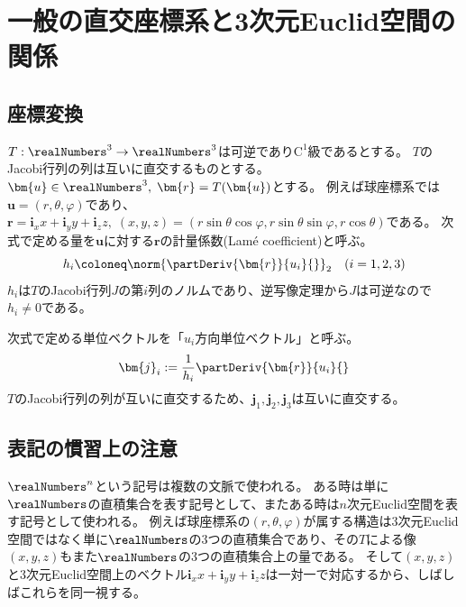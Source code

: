 \chapter{一般の直交座標系と3次元Euclid空間の関係}
    \section{座標変換}
        $T:\realNumbers^3\to\realNumbers^3$は可逆であり$\mathrm{C}^1$級であるとする。
        $T$のJacobi行列の列は互いに直交するものとする。
        $\bm{u}\in\realNumbers^3,\;\bm{r} = T(\bm{u})$とする。
        例えば球座標系では$\bm{u} = (r,\theta,\varphi)$であり、$\bm{r} = \bm{i}_x x + \bm{i}_y y + \bm{i}_z z,\;(x,y,z) = (r\sin\theta\cos\varphi,r\sin\theta\sin\varphi,r\cos\theta)$である。
        次式で定める量を$\bm{u}$に対する$\bm{r}$の計量係数(Lam\'{e} coefficient)と呼ぶ。
        \[ h_i \coloneq \norm{\partDeriv{\bm{r}}{u_i}{}}_2 \quad (i=1,2,3) \]
        $h_i$は$T$のJacobi行列$J$の第$i$列のノルムであり、逆写像定理から$J$は可逆なので$h_i \neq 0$である。
        \par
        次式で定める単位ベクトルを「$u_i$方向単位ベクトル」と呼ぶ。
        \[ \bm{j}_i := \frac{1}{h_i}\partDeriv{\bm{r}}{u_i}{} \]
        $T$のJacobi行列の列が互いに直交するため、$\bm{j}_1,\bm{j}_2,\bm{j}_3$は互いに直交する。
    \section{表記の慣習上の注意}
        $\realNumbers^n$という記号は複数の文脈で使われる。
        ある時は単に$\realNumbers$の直積集合を表す記号として、またある時は$n$次元Euclid空間を表す記号として使われる。
        例えば球座標系の$(r,\theta,\varphi)$が属する構造は3次元Euclid空間ではなく単に$\realNumbers$の3つの直積集合であり、その$T$による像$(x,y,z)$もまた$\realNumbers$の3つの直積集合上の量である。
        そして$(x,y,z)$と3次元Euclid空間上のベクトル$\bm{i}_x x + \bm{i}_y y + \bm{i}_z z$は一対一で対応するから、しばしばこれらを同一視する。

